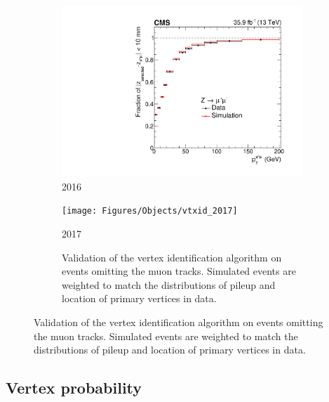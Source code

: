 \begin{figure}[h!]
  \centering
  \begin{subfigure}{0.45\textwidth}
    \includegraphics[width=\textwidth]{Figures/Objects/vtxid_2016}
    \caption{2016}
    \label{fig:obj_vtxid_2016}
  \end{subfigure}
  \begin{subfigure}{0.45\textwidth}
    \texttt{[image: Figures/Objects/vtxid\_2017]}
    \caption{2017}
    \label{fig:obj_vtxid_2016}
  \caption{
  Validation of the \Hgg vertex identification algorithm on \Zmumu events
  omitting the muon tracks. Simulated events are weighted to match the distributions of pileup
  and location of primary vertices in data.
  }
  \label{fig:obj_vtxid}
  \end{subfigure}
\end{figure}

\subsection{Vertex probability}

